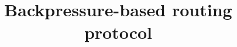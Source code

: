 \documentclass[12pt, a4paper, twocolumn]{article}
\begin{document}
\title{\bf{Backpressure-based routing protocol}}
\date{}
\maketitle







%


\end{document}
